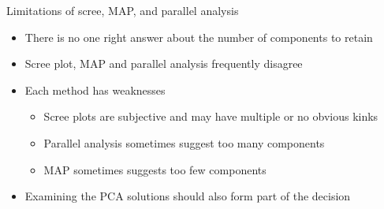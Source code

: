 \documentclass[
  ignorenonframetext,
]{beamer}
\providecommand{\tightlist}{%
  \setlength{\itemsep}{0pt}\setlength{\parskip}{0pt}}
\begin{document}
\begin{frame}{Limitations of scree, MAP, and parallel analysis}
\protect\hypertarget{limitations-of-scree-map-and-parallel-analysis}{}

\begin{itemize}
\tightlist
\item
  There is no one right answer about the number of components to retain
\item
  Scree plot, MAP and parallel analysis frequently disagree
\item
  Each method has weaknesses

  \begin{itemize}
  \tightlist
  \item
    Scree plots are subjective and may have multiple or no obvious kinks
  \item
    Parallel analysis sometimes suggest too many components
  \item
    MAP sometimes suggests too few components
  \end{itemize}
\item
  Examining the PCA solutions should also form part of the decision
\end{itemize}

\end{frame}
\end{document}
